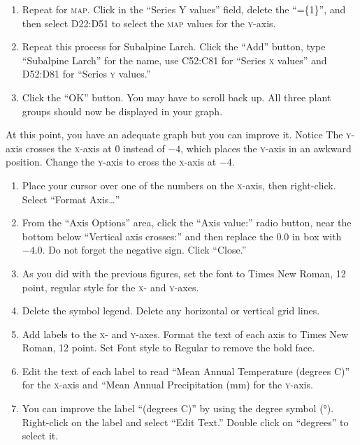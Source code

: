 \documentclass[12pt, hidelinks]{exam}
\newcommand*\axis[1]{{\scshape #1}-axis}
\begin{document}
\begin{questions}
\begin{enumerate}[resume]
	\item Repeat for \textsc{map}. Click in the “Series Y values” field, delete the “=\{1\}”, and then select {\liningnum D22:D51} to select the \textsc{map} values for the \axis{y}. 

	\item Repeat this process for Subalpine Larch. Click the “Add” button, type “Subalpine Larch” for the name, use {\liningnum C52:C81} for “Series \textsc{x} values” and {\liningnum D52:D81} for “Series \textsc{y} values.” 

	\item Click the “OK” button. You may have to scroll back up. All three plant groups should now be displayed in your graph. 
\end{enumerate}

At this point, you have an adequate graph but you can improve it. Notice The \axis{y} crosses the \axis{x} at $0$ instead of $-4$, which places the \axis{y} in an awkward position. Change the \axis{y} to cross the \axis{x} at $-4$.

\begin{enumerate}[resume]
	\item Place your cursor over one of the numbers on the \axis{x}, then right-click. Select “Format Axis\dots”

	\item From the “Axis Options” area, click the “Axis value:” radio button, near the bottom below “Vertical axis crosses:” and then replace the $0.0$ in box with $-4.0$. Do not forget the negative sign. Click “Close.” 

	\item As you did with the previous figures, set the font to Times New Roman, 12 point, regular style for the \textsc{x}- and \textsc{y}-axes.
	
	\item Delete the symbol legend. Delete any horizontal or vertical grid lines.
	
	\item Add labels to the \textsc{x}- and \textsc{y}-axes. Format the text of each axis to Times New Roman, 12 point. Set Font style to Regular to remove the bold face.
	
	\item Edit the text of each label to read “Mean Annual Temperature (degrees C)” for the \axis{x} and “Mean Annual Precipitation (mm) for the \axis{y}.

	\item You can improve the label “(degrees C)” by using the degree symbol (°). Right-click on the label and select “Edit Text.” Double click on “degrees” to select it.


\end{enumerate}
\end{questions}
\end{document}
